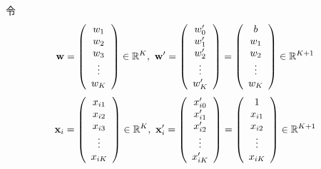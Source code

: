 \documentclass{article}
\begin{document}
\noindent
令
\begin{align*}
    {\bf w} = 
    \left(
    \begin{array}{c}
        w_1\\
        w_2\\
        w_3\\
        \vdots\\
        w_K
    \end{array}
    \right)
    \in {\mathbb R}^K,\ 
    {\bf w}^\prime =
    \left(
    \begin{array}{c}
        w_0^\prime\\
        w_1^\prime\\
        w_2^\prime\\
        \vdots\\
        w_K^\prime
    \end{array}
    \right) =
    \left(
    \begin{array}{c}
        b\\
        w_1\\
        w_2\\
        \vdots\\
        w_K
    \end{array}
    \right)
    \in {\mathbb R}^{K + 1}
\end{align*}
\begin{align*}
    {\bf x}_i =
    \left(
    \begin{array}{c}
        x_{i1}\\
        x_{i2}\\
        x_{i3}\\
        \vdots\\
        x_{iK}
    \end{array}
    \right)
    \in {\mathbb R}^K,\ 
    {\bf x}_i^\prime =
    \left(
    \begin{array}{c}
        x_{i0}^\prime\\
        x_{i1}^\prime\\
        x_{i2}^\prime\\
        \vdots\\
        x_{iK}^\prime
    \end{array}
    \right) =
    \left(
    \begin{array}{c}
        1\\
        x_{i1}\\
        x_{i2}\\
        \vdots\\
        x_{iK}
    \end{array}
    \right)
    \in {\mathbb R}^{K + 1}
\end{align*}
\end{document}
